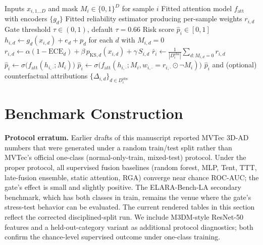 \documentclass[10pt,conference]{IEEEtran}
\newcommand{\method}{RGA}
\newcommand{\benchmark}{ELARA-Bench-LA}
\begin{document}
\begin{algorithm}[t]
\caption{\method{} inference}
\label{alg:rga}
\begin{algorithmic}[1]
\Require Inputs $x_{i,1\ldots D}$ and mask $M_i \in \{0,1\}^D$ for sample $i$
\Require Fitted attention model $f_{\text{att}}$ with encoders $\{g_d\}$
\Require Fitted reliability estimator producing per-sample weights $r_{i,d}$
\Require Gate threshold $\tau \in (0,1)$, default $\tau = 0.66$
\Ensure Risk score $\hat p_i \in [0,1]$
\State $h_{i,d} \gets g_d(x_{i,d}) + e_d + p_d$ for each $d$ with $M_{i,d} = 0$
\State $r_{i,d} \gets \alpha(1-\mathrm{ECE}_d) + \beta\, p_{\mathrm{KS},d}(x_{i,d}) + \gamma\, S_{i,d}$
\State $\bar r_i \gets \frac{1}{|D_i^{\text{obs}}|} \sum_{d: M_{i,d}=0} r_{i,d}$
    \State $\hat p_i \gets \sigma\bigl(f_{\text{att}}(h_{i,\cdot}; M_i)\bigr)$ 
\Else
    \State $\hat p_i \gets \sigma\bigl(f_{\text{att}}(h_{i,\cdot}; M_i, w_{i,\cdot} {=} r_{i,\cdot} \odot \neg M_i)\bigr)$
    \State \hspace{1em} 
\EndIf
\State \Return $\hat p_i$ and (optional) counterfactual attributions $\{\Delta_{i,d}\}_{d \in D_i^{\text{obs}}}$
\end{algorithmic}
\end{algorithm}

\section{Benchmark Construction}

\noindent\textbf{Protocol erratum.} Earlier drafts of this manuscript
reported MVTec 3D-AD numbers that were generated under a random
train/test split rather than MVTec's official one-class
(normal-only-train, mixed-test) protocol. Under the proper protocol,
all supervised fusion baselines (random forest, MLP, Tent, TTT,
late-fusion ensemble, static attention, \method) converge near chance
ROC-AUC; the gate's effect is small and slightly positive. The
\benchmark{} secondary benchmark, which has both classes in train,
remains the venue where the gate's stress-test behavior can be
evaluated. The current rendered tables in this section reflect the
corrected disciplined-split run. We include M3DM-style ResNet-50 features
and a held-out-category
variant as additional protocol diagnostics; both confirm the
chance-level supervised outcome under one-class training.
\end{document}
